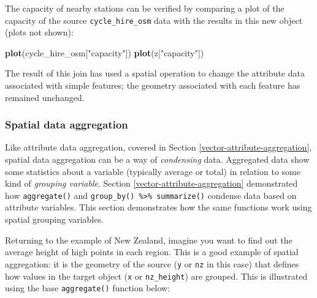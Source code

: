 \documentclass[]{krantz}
\newenvironment{Shaded}{\begin{snugshade}}{\end{snugshade}}
\newcommand{\CommentTok}[1]{\textcolor[rgb]{0.37,0.37,0.37}{\textit{#1}}}
\newcommand{\DataTypeTok}[1]{\textcolor[rgb]{0.27,0.27,0.27}{#1}}
\newcommand{\KeywordTok}[1]{\textcolor[rgb]{0.27,0.27,0.27}{\textbf{#1}}}
\newcommand{\NormalTok}[1]{#1}
\newcommand{\OperatorTok}[1]{\textcolor[rgb]{0.43,0.43,0.43}{\textbf{#1}}}
\newcommand{\StringTok}[1]{\textcolor[rgb]{0.5,0.5,0.5}{#1}}
\begin{document}
\begin{Shaded}
\end{Shaded}

The capacity of nearby stations can be verified by comparing a plot of the capacity of the source \texttt{cycle\_hire\_osm} data with the results in this new object (plots not shown):

\begin{Shaded}
\begin{Highlighting}[]
\KeywordTok{plot}\NormalTok{(cycle_hire_osm[}\StringTok{"capacity"}\NormalTok{])}
\KeywordTok{plot}\NormalTok{(z[}\StringTok{"capacity"}\NormalTok{])}
\end{Highlighting}
\end{Shaded}

The result of this join has used a spatial operation to change the attribute data associated with simple features; the geometry associated with each feature has remained unchanged.

\hypertarget{spatial-aggr}{%
\subsubsection{Spatial data aggregation}\label{spatial-aggr}}

Like attribute data aggregation, covered in Section \ref{vector-attribute-aggregation}, spatial data aggregation can be a way of \emph{condensing} data.
Aggregated data show some statistics about a variable (typically average or total) in relation to some kind of \emph{grouping variable}.
Section \ref{vector-attribute-aggregation} demonstrated how \texttt{aggregate()} and \texttt{group\_by()\ \%\textgreater{}\%\ summarize()} condense data based on attribute variables.
This section demonstrates how the same functions work using spatial grouping variables.

Returning to the example of New Zealand, imagine you want to find out the average height of high points in each region.
This is a good example of spatial aggregation: it is the geometry of the source (\texttt{y} or \texttt{nz} in this case) that defines how values in the target object (\texttt{x} or \texttt{nz\_height}) are grouped.
This is illustrated using the base \texttt{aggregate()} function below:
\end{document}
